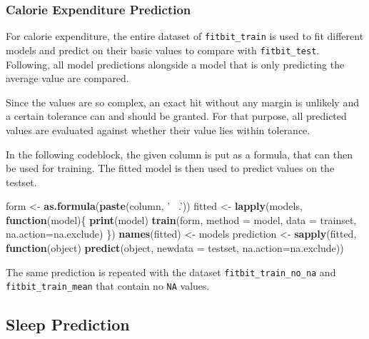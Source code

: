 \documentclass[
]{article}
\newenvironment{Shaded}{\begin{snugshade}}{\end{snugshade}}
\newcommand{\ControlFlowTok}[1]{\textcolor[rgb]{0.13,0.29,0.53}{\textbf{#1}}}
\newcommand{\DataTypeTok}[1]{\textcolor[rgb]{0.13,0.29,0.53}{#1}}
\newcommand{\KeywordTok}[1]{\textcolor[rgb]{0.13,0.29,0.53}{\textbf{#1}}}
\newcommand{\NormalTok}[1]{#1}
\newcommand{\StringTok}[1]{\textcolor[rgb]{0.31,0.60,0.02}{#1}}
\begin{document}
\hypertarget{calorie-expenditure-prediction}{%
\subsubsection{Calorie Expenditure
Prediction}\label{calorie-expenditure-prediction}}

For calorie expenditure, the entire dataset of \texttt{fitbit\_train} is
used to fit different models and predict on their basic values to
compare with \texttt{fitbit\_test}. Following, all model predictions
alongside a model that is only predicting the average value are
compared.

Since the values are so complex, an exact hit without any margin is
unlikely and a certain tolerance can and should be granted. For that
purpose, all predicted values are evaluated against whether their value
lies within tolerance.

In the following codeblock, the given column is put as a formula, that
can then be used for training. The fitted model is then used to predict
values on the testset.

\begin{Shaded}
\begin{Highlighting}[]
\NormalTok{  form <-}\StringTok{ }\KeywordTok{as.formula}\NormalTok{(}\KeywordTok{paste}\NormalTok{(column, }\StringTok{'~ .'}\NormalTok{))}
\NormalTok{    fitted <-}\StringTok{ }\KeywordTok{lapply}\NormalTok{(models, }\ControlFlowTok{function}\NormalTok{(model)\{ }
    \KeywordTok{print}\NormalTok{(model)}
    \KeywordTok{train}\NormalTok{(form, }\DataTypeTok{method =}\NormalTok{ model, }\DataTypeTok{data =}\NormalTok{ trainset, }\DataTypeTok{na.action=}\NormalTok{na.exclude)}
\NormalTok{  \}) }
  \KeywordTok{names}\NormalTok{(fitted) <-}\StringTok{ }\NormalTok{models}
\NormalTok{  prediction <-}\StringTok{ }\KeywordTok{sapply}\NormalTok{(fitted, }\ControlFlowTok{function}\NormalTok{(object) }
    \KeywordTok{predict}\NormalTok{(object, }\DataTypeTok{newdata =}\NormalTok{ testset, }\DataTypeTok{na.action=}\NormalTok{na.exclude))}
\end{Highlighting}
\end{Shaded}

The same prediction is repeated with the dataset
\texttt{fitbit\_train\_no\_na} and \texttt{fitbit\_train\_mean} that
contain no \texttt{NA} values.

\hypertarget{sleep-prediction}{%
\subsection{Sleep Prediction}\label{sleep-prediction}}
\end{document}
